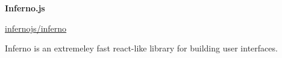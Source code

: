 
{\large\textbf{Inferno.js}}

\href{http://github.com/infernojs}{infernojs/inferno}

Inferno is an extremeley fast react-like library for building user interfaces.

